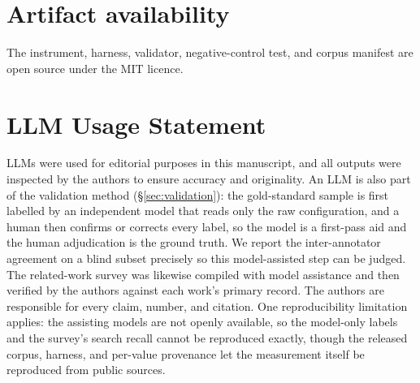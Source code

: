 \section*{Artifact availability}\label{sec:artifact}
The instrument, harness, validator, negative-control test, and corpus manifest are
open source under the MIT licence. 

\section*{LLM Usage Statement}
LLMs were used for editorial purposes in this manuscript, and all outputs were
inspected by the authors to ensure accuracy and originality. An LLM is also part of
the validation method (\S\ref{sec:validation}): the gold-standard sample is first
labelled by an independent model that reads only the raw configuration, and a human
then confirms or corrects every label, so the model is a first-pass aid and the human
adjudication is the ground truth. We report the inter-annotator agreement on a blind
subset precisely so this model-assisted step can be judged. The related-work survey
was likewise compiled with model assistance and then verified by the authors against
each work's primary record. The authors are responsible for every claim, number, and
citation. One reproducibility limitation applies: the assisting models are not openly
available, so the model-only labels and the survey's search recall cannot be
reproduced exactly, though the released corpus, harness, and per-value provenance let
the measurement itself be reproduced from public sources.
